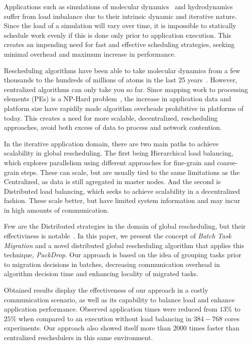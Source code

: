 Applications such as simulations of molecular dynamics~\cite{namd} and hydrodynamics~\cite{IPDPS13:LULESH} suffer from load imbalance due to their intrinsic dynamic and iterative nature.
Since the load of a simulation will vary over time, it is impossible to statically schedule work evenly if this is done only prior to application execution.
This creates an impending need for fast and effective scheduling strategies, seeking minimal overhead and maximum increase in performance.

Rescheduling algorithms have been able to take molecular dynamics from a few thousands to the hundreds of millions of atoms in the last 25 years~\cite{namd0}.
However, centralized algorithms can only take you so far.
Since mapping work to processing elements (PEs) is a NP-Hard problem~\cite{npcomplete}, the increase in application data and platform size have rapidily made algorithm overheads prohibitive in platforms of today.
This creates a need for more scalable, decentralized, rescheduling approaches, avoid both excess of data to process and network contention.

In the iterative application domain, there are two main paths to achieve scalability in global rescheduling.
The first being Hierarchical load balancing, which explores parallelism using different approaches for fine-grain and coarse-grain steps.
These can scale, but are usually tied to the same limitations as the Centralized, as data is still agregated in master nodes.
And the second is Distributed load balancing, which seeks to achieve scalability in a decentralized fashion.
These scale better, but have limited system information and may incur in high amounts of communication.

Few are the Distributed strategies in the domain of global rescheduling, but their effectiviness is notable~\cite{grapevine,diffus}.
In this paper, we present the concept of \textit{Batch Task Migration} and a novel distributed global rescheduling algorithm that applies this technique, \textit{PackDrop}.
Our approach is based on the idea of grouping tasks prior to migration decisions in batches, decreasing communication overhead in algorithm decision time and enhancing locality of migrated tasks.

Obtained results display the effectiveness of our approach in a costly communication scenario, as well as its capability to balance load and enhance application performance.
Observed application times were reduced from $13\%$ to $25\%$ when compared to an execution without load balancing in $384-768$ cores experiments.
Our approach also showed itself more than $2000$ times faster than centralized reschedulers in this same environment.

